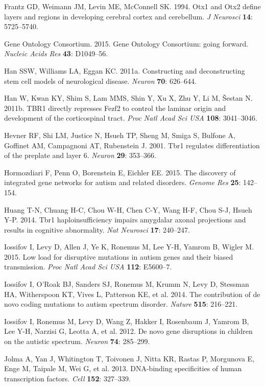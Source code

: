 \documentclass[]{article}
\begin{document}
Frantz GD, Weimann JM, Levin ME, McConnell SK. 1994. Otx1 and Otx2
define layers and regions in developing cerebral cortex and cerebellum.
\emph{J Neurosci} \textbf{14}: 5725--5740.

Gene Ontology Consortium. 2015. Gene Ontology Consortium: going forward.
\emph{Nucleic Acids Res} \textbf{43}: D1049--56.

Han SSW, Williams LA, Eggan KC. 2011a. Constructing and deconstructing
stem cell models of neurological disease. \emph{Neuron} \textbf{70}:
626--644.

Han W, Kwan KY, Shim S, Lam MMS, Shin Y, Xu X, Zhu Y, Li M, Šestan N.
2011b. TBR1 directly represses Fezf2 to control the laminar origin and
development of the corticospinal tract. \emph{Proc Natl Acad Sci USA}
\textbf{108}: 3041--3046.

Hevner RF, Shi LM, Justice N, Hsueh TP, Sheng M, Smiga S, Bulfone A,
Goffinet AM, Campagnoni AT, Rubenstein J. 2001. Tbr1 regulates
differentiation of the preplate and layer 6. \emph{Neuron} \textbf{29}:
353--366.

Hormozdiari F, Penn O, Borenstein E, Eichler EE. 2015. The discovery of
integrated gene networks for autism and related disorders. \emph{Genome
Res} \textbf{25}: 142--154.

Huang T-N, Chuang H-C, Chou W-H, Chen C-Y, Wang H-F, Chou S-J, Hsueh
Y-P. 2014. Tbr1 haploinsufficiency impairs amygdalar axonal projections
and results in cognitive abnormality. \emph{Nat Neurosci} \textbf{17}:
240--247.

Iossifov I, Levy D, Allen J, Ye K, Ronemus M, Lee Y-H, Yamrom B, Wigler
M. 2015. Low load for disruptive mutations in autism genes and their
biased transmission. \emph{Proc Natl Acad Sci USA} \textbf{112}:
E5600--7.

Iossifov I, O'Roak BJ, Sanders SJ, Ronemus M, Krumm N, Levy D, Stessman
HA, Witherspoon KT, Vives L, Patterson KE, et al. 2014. The contribution
of de novo coding mutations to autism spectrum disorder. \emph{Nature}
\textbf{515}: 216--221.

Iossifov I, Ronemus M, Levy D, Wang Z, Hakker I, Rosenbaum J, Yamrom B,
Lee Y-H, Narzisi G, Leotta A, et al. 2012. De novo gene disruptions in
children on the autistic spectrum. \emph{Neuron} \textbf{74}: 285--299.

Jolma A, Yan J, Whitington T, Toivonen J, Nitta KR, Rastas P, Morgunova
E, Enge M, Taipale M, Wei G, et al. 2013. DNA-binding specificities of
human transcription factors. \emph{Cell} \textbf{152}: 327--339.
\end{document}
